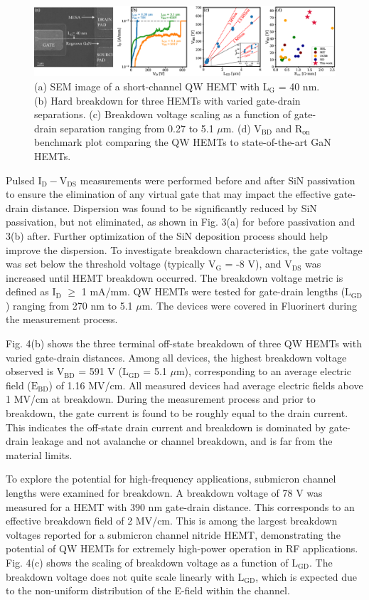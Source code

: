 \documentclass[journal]{IEEEtran}
\begin{document}
\begin{figure}[!t]
\centering
\includegraphics[width=\textwidth]{Figure4_withSEM.eps}
\caption{ (a) SEM image of a short-channel QW HEMT with $\mathrm{L_G}$ = 40 nm. (b) Hard breakdown for three HEMTs with varied gate-drain separations. (c) Breakdown voltage scaling as a function of gate-drain separation ranging from 0.27 to 5.1 $\mu$m. (d) $\mathrm{V_{BD}}$ and $\mathrm{R_{on}}$ benchmark plot comparing the QW HEMTs to state-of-the-art GaN HEMTs. }
\label{fig:benchmark}
\end{figure}


Pulsed $\mathrm{I_D-V_{DS}}$ measurements were performed before and after SiN passivation to ensure the elimination of any virtual gate that may impact the effective gate-drain distance. Dispersion was found to be significantly reduced by SiN passivation, but not eliminated, as shown in Fig. 3(a) for before passivation and 3(b) after. Further optimization of the SiN deposition process should help improve the dispersion. To investigate breakdown characteristics, the gate voltage was set below the threshold voltage (typically $\mathrm{V_G}$ = -8 V), and $\mathrm{V_{DS}}$ was increased until HEMT breakdown occurred. The breakdown voltage metric is defined as $\mathrm{I_D}$ $\geq$ 1 mA/mm. QW HEMTs were tested for gate-drain lengths ($\mathrm{L_{GD}}$) ranging from 270 nm to 5.1 $\mu$m. The devices were covered in Fluorinert during the measurement process.

Fig. 4(b) shows the three terminal off-state breakdown of three QW HEMTs with varied gate-drain distances. Among all devices, the highest breakdown voltage observed is $\mathrm{V_{BD}}$ = 591 V ($\mathrm{L_{GD}}$ = 5.1 $\mu$m), corresponding to an average electric field ($\mathrm{E_{BD}}$) of 1.16 MV/cm. All measured devices had average electric fields above 1 MV/cm at breakdown. During the measurement process and prior to breakdown, the gate current is found to be roughly equal to the drain current. This indicates the off-state drain current and breakdown is dominated by gate-drain leakage and not avalanche or channel breakdown, and is far from the material limits. 

To explore the potential for high-frequency applications, submicron channel lengths were examined for breakdown. A breakdown voltage of 78 V was measured for a HEMT with 390 nm gate-drain distance. This corresponds to an effective breakdown field of 2 MV/cm. This is among the largest breakdown voltages reported for a submicron channel nitride HEMT, demonstrating the potential of QW HEMTs for extremely high-power operation in RF applications. Fig. 4(c) shows the scaling of breakdown voltage as a function of $\mathrm{L_{GD}}$. The breakdown voltage does not quite scale linearly with $\mathrm{L_{GD}}$, which is expected due to the non-uniform distribution of the E-field within the channel.
\end{document}
